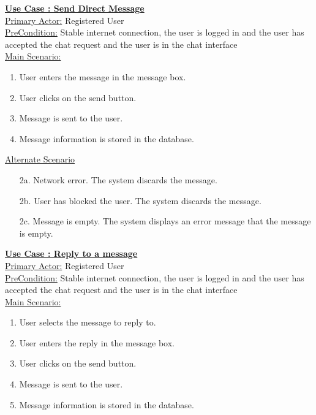 \documentclass[conference,compsoc]{IEEEtran}
\newcounter{UC}
\newcommand{\nextU}{\stepcounter{UC}\theUC}
\begin{document}
\underline{\textbf{Use Case \nextU: Send Direct Message}}\\

\underline{Primary Actor:} Registered User\\

\underline{PreCondition:} Stable internet connection, the user is logged in and the user has accepted the chat request and the user is in the chat interface\\

\underline{Main Scenario:}\\
\begin{enumerate}
    \item User enters the message in the message box.
    \item User clicks on the send button.
    \item Message is sent to the user.
    \item Message information is stored in the database.
\end{enumerate}

\underline{Alternate Scenario}
\begin{enumerate}
    \item [2a.] Network error. The system discards the message.
    \item [2b.] User has blocked the user. The system discards the message.
    \item [2c.] Message is empty. The system displays an error message that the message is empty.
\end{enumerate}

\underline{\textbf{Use Case \nextU: Reply to a message}}\\

\underline{Primary Actor:} Registered User\\

\underline{PreCondition:} Stable internet connection, the user is logged in and the user has accepted the chat request and the user is in the chat interface\\

\underline{Main Scenario:}\\
\begin{enumerate}
    \item User selects the message to reply to.
    \item User enters the reply in the message box.
    \item User clicks on the send button.
    \item Message is sent to the user.
    \item Message information is stored in the database.
\end{enumerate}
\end{document}

